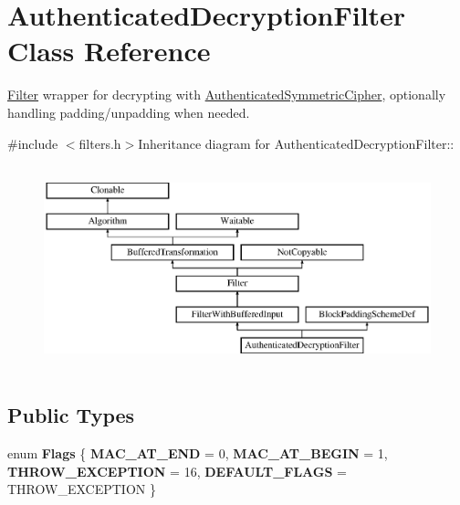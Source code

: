 \hypertarget{class_authenticated_decryption_filter}{
\section{AuthenticatedDecryptionFilter Class Reference}
\label{class_authenticated_decryption_filter}
}


\hyperlink{class_filter}{Filter} wrapper for decrypting with \hyperlink{class_authenticated_symmetric_cipher}{AuthenticatedSymmetricCipher}, optionally handling padding/unpadding when needed.  


{\ttfamily \#include $<$filters.h$>$}Inheritance diagram for AuthenticatedDecryptionFilter::\begin{figure}[H]
\begin{center}
\leavevmode
\includegraphics[height=5.95745cm]{class_authenticated_decryption_filter}
\end{center}
\end{figure}
\subsection*{Public Types}
\begin{DoxyCompactItemize}
\item 
enum {\bfseries Flags} \{ {\bfseries MAC\_\-AT\_\-END} = 0, 
{\bfseries MAC\_\-AT\_\-BEGIN} = 1, 
{\bfseries THROW\_\-EXCEPTION} = 16, 
{\bfseries DEFAULT\_\-FLAGS} =  THROW\_\-EXCEPTION
 \}
\end{DoxyCompactItemize}
